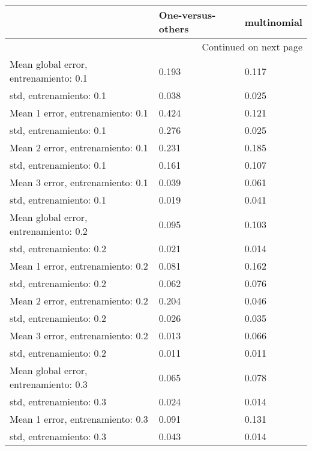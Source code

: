 \begin{longtable}{p{4cm}|p{1.5cm}|p{1.5cm}}
\toprule
{} &  One-versus-others &  multinomial \\
\midrule
\endhead
\midrule
\multicolumn{3}{r}{{Continued on next page}} \\
\midrule
\endfoot

\bottomrule
\endlastfoot
Mean global error, entrenamiento: 0.1 &              0.193 &        0.117 \\
std, entrenamiento: 0.1               &              0.038 &        0.025 \\
Mean 1 error, entrenamiento: 0.1      &              0.424 &        0.121 \\
std, entrenamiento: 0.1               &              0.276 &        0.025 \\
Mean 2 error, entrenamiento: 0.1      &              0.231 &        0.185 \\
std, entrenamiento: 0.1               &              0.161 &        0.107 \\
Mean 3 error, entrenamiento: 0.1      &              0.039 &        0.061 \\
std, entrenamiento: 0.1               &              0.019 &        0.041 \\
Mean global error, entrenamiento: 0.2 &              0.095 &        0.103 \\
std, entrenamiento: 0.2               &              0.021 &        0.014 \\
Mean 1 error, entrenamiento: 0.2      &              0.081 &        0.162 \\
std, entrenamiento: 0.2               &              0.062 &        0.076 \\
Mean 2 error, entrenamiento: 0.2      &              0.204 &        0.046 \\
std, entrenamiento: 0.2               &              0.026 &        0.035 \\
Mean 3 error, entrenamiento: 0.2      &              0.013 &        0.066 \\
std, entrenamiento: 0.2               &              0.011 &        0.011 \\
Mean global error, entrenamiento: 0.3 &              0.065 &        0.078 \\
std, entrenamiento: 0.3               &              0.024 &        0.014 \\
Mean 1 error, entrenamiento: 0.3      &              0.091 &        0.131 \\
std, entrenamiento: 0.3               &              0.043 &        0.014 \\

\end{longtable}

